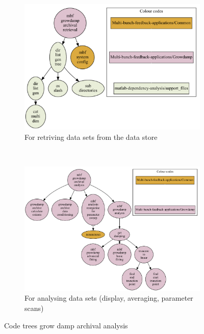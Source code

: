 \documentclass{report}
\begin{document}
\begin{figure}[hbt]
   \centering
    \begin{subfigure}[b]{0.3\textwidth}
        \includegraphics[width=\textwidth]{mbf_growdamp_archival_retrieval.pdf}
        \caption{For retriving data sets from the data store}
        \label{fig:growdamp_archiving_retrival}
    \end{subfigure}
    ~ %
    \begin{subfigure}[b]{0.3\textwidth}
        \includegraphics[width=\textwidth]{mbf_growdamp_archival_analysis.pdf}
        \caption{For analysing data sets (display, averaging, parameter scans)}
        \label{fig:growdamp_archiving_analysis}
    \end{subfigure}
    \caption{Code trees grow damp archival analysis}\label{fig:growdamp_archival_code_trees}
\end{figure}
\end{document}

